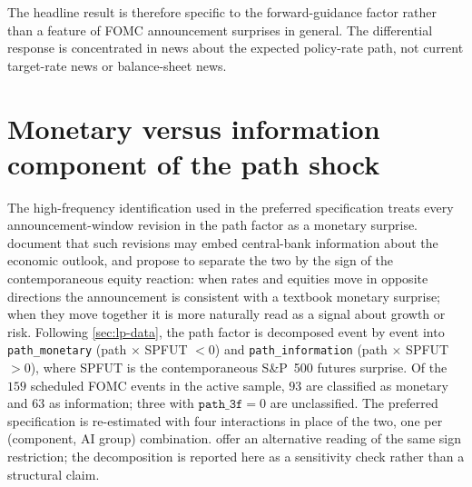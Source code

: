 The headline result is therefore specific to the forward-guidance
factor rather than a feature of FOMC announcement surprises in
general. The differential response is concentrated in news about the
expected policy-rate path, not current target-rate news or
balance-sheet news.

\section{Monetary versus information component of the path shock}
\label{sec:rob-pathinfo}

The high-frequency identification used in the preferred specification
treats every announcement-window revision in the path factor as a
monetary surprise. \citet{nakamuraSteinsson2018} document that such
revisions may embed central-bank information about the economic
outlook, and \citet{jarocinskiKaradi2020} propose to separate the two
by the sign of the contemporaneous equity reaction: when rates and
equities move in opposite directions the announcement is consistent
with a textbook monetary surprise; when they move together it is
more naturally read as a signal about growth or risk. Following
\cref{sec:lp-data}, the path factor is decomposed event by event into
\texttt{path\_monetary} (path $\times$ SPFUT $< 0$) and
\texttt{path\_information} (path $\times$ SPFUT $> 0$), where SPFUT
is the contemporaneous S\&P~500 futures surprise. Of the $159$
scheduled FOMC events in the active sample, $93$ are classified as
monetary and $63$ as information; three with $\texttt{path\_3f} = 0$
are unclassified. The preferred specification is re-estimated with
four interactions in place of the two, one per (component, AI group)
combination. \citet{bauerSwanson2023} offer an alternative reading of
the same sign restriction; the decomposition is reported here as a
sensitivity check rather than a structural claim.

\begin{table}[htbp]
\centering\small
\caption[Path--information split: key-horizon estimates]{Path--information
split: key-horizon estimates}
\label{tab:path_info_key}

\end{table}

